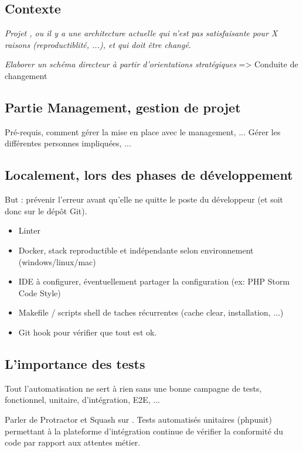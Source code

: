
\subsection{Contexte}

\textit{Projet \bv{}, ou il y a une architecture actuelle qui n'est pas satisfaisante pour X raisons (reproductiblité, ...), et qui doit être changé}.

\textit{Elaborer un schéma directeur à partir d’orientations stratégiques} => Conduite de changement

\subsection{Partie Management, gestion de projet}

Pré-requis, comment gérer la mise en place avec le management, ... Gérer les différentes personnes impliquées, ...

\subsection{Localement, lors des phases de développement}

But : prévenir l'erreur avant qu'elle ne quitte le poste du développeur (et soit donc sur le dépôt Git).

 \begin{itemize}
 	\item Linter
 	\item Docker, stack reproductible et indépendante selon environnement (windows/linux/mac) 
 	\item IDE à configurer, éventuellement partager la configuration (ex: PHP Storm Code Style)
 	\item Makefile / scripts shell de taches récurrentes (cache clear, installation, ...)
 	\item Git hook pour vérifier que tout est ok.
 \end{itemize}

\subsection{L'importance des tests}

Tout l'automatisation ne sert à rien sans une bonne campagne de tests, fonctionnel, unitaire, d'intégration, E2E, ...

Parler de Protractor et Squash sur \bv. Tests automatisés unitaires (phpunit) permettant à la plateforme d'intégration continue de vérifier la conformité du code par rapport aux attentes métier.

